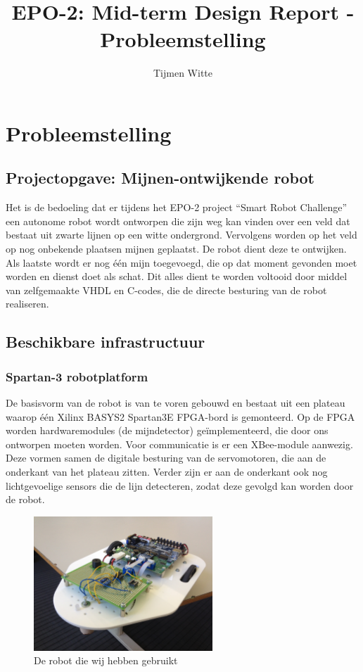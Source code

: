 \documentclass{report}
\title{EPO-2: Mid-term Design Report - Probleemstelling}
\author{Tijmen Witte}
\begin{document}
\chapter{Probleemstelling}
\label{ch:probleemstelling}

\section{Projectopgave: Mijnen-ontwijkende robot}

Het is de bedoeling dat er tijdens het EPO-2 project ``Smart Robot Challenge'' een autonome robot wordt ontworpen die zijn weg kan vinden over een veld dat bestaat uit zwarte lijnen op een witte ondergrond.
Vervolgens worden op het veld op nog onbekende plaatsen mijnen geplaatst. De robot dient deze te ontwijken.
Als laatste wordt er nog één mijn toegevoegd, die op dat moment gevonden moet worden en dienst doet als schat.
Dit alles dient te worden voltooid door middel van zelfgemaakte VHDL en C-codes, die de directe besturing van de robot realiseren.


\section{Beschikbare infrastructuur}
\subsection{Spartan-3 robotplatform}

De basisvorm van de robot is van te voren gebouwd en bestaat uit een plateau waarop één Xilinx BASYS2 Spartan3E FPGA-bord is gemonteerd.
Op de FPGA worden hardwaremodules (de mijndetector) geïmplementeerd, die door ons  ontworpen moeten worden.
Voor communicatie is er een XBee-module aanwezig.
Deze vormen samen de digitale besturing van de servomotoren, die aan de onderkant van het plateau zitten.
Verder zijn er aan de onderkant ook nog lichtgevoelige sensors die de lijn detecteren, zodat deze gevolgd kan worden door de robot.

\begin{figure}[H]
	\centering
	\includegraphics[width=0.6\textwidth]{robot.jpg}
	\caption{De robot die wij hebben gebruikt}
	\label{fig:robot}
\end{figure}
\end{document}
